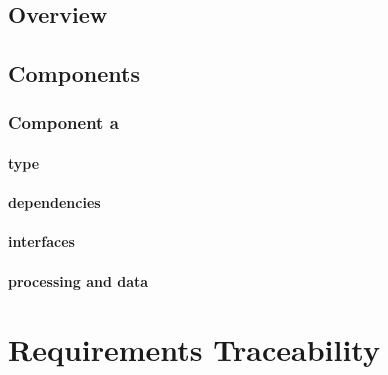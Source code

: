 \documentclass[9pt,twoside,openright,a4paper,pagesize]{report}
\begin{document}
\section{Overview}
\label{sec:scd:overview}
\section{Components}
\subsection{Component a}
\subsubsection{type}
\subsubsection{dependencies}
\subsubsection{interfaces}
\subsubsection{processing and data}
\chapter{Requirements Traceability}
\label{chap:traceability}


\begin{appendices}
\end{appendices}
\end{document}
